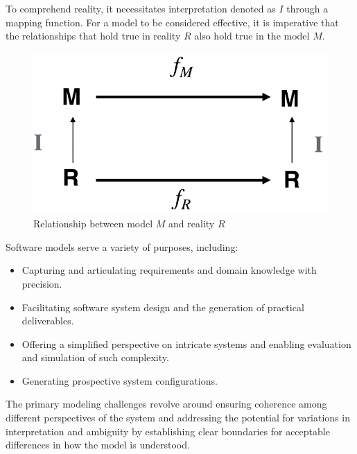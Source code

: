\documentclass[12pt, a4paper]{report}
\begin{document}
    To comprehend reality, it necessitates interpretation denoted as $I$ through a mapping function.
    For a model to be considered effective, it is imperative that the relationships that hold true in reality $R$ also hold true in the model $M$.
    \begin{figure}[H]
        \centering
        \includegraphics[width=0.5\linewidth]{images/modeling.png}
        \caption{Relationship between model $M$ and reality $R$}
    \end{figure}
    Software models serve a variety of purposes, including:
    \begin{itemize}
        \item Capturing and articulating requirements and domain knowledge with precision.
        \item Facilitating software system design and the generation of practical deliverables.
        \item Offering a simplified perspective on intricate systems and enabling evaluation and simulation of such complexity.
        \item Generating prospective system configurations.
    \end{itemize}
    The primary modeling challenges revolve around ensuring coherence among different perspectives of the system and addressing the potential for variations in interpretation and ambiguity by establishing clear boundaries for acceptable differences in how the model is understood.
     
\end{document}
